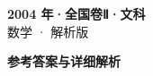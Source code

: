 \documentclass[zihao=-4, a4paper]{ctexart}
\begin{document}
\begin{center}
  {\Large\bfseries 2004 年·全国卷Ⅱ·文科}\\[4pt]
  {\large 数学 · 解析版}
\end{center}
\medskip
{}

\clearpage
{}
\begin{center}{\Large\bfseries 参考答案与详细解析}\end{center}
\medskip

\end{document}
